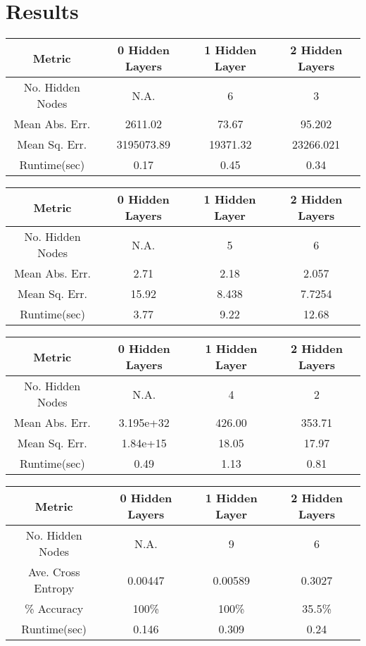 \documentclass[twoside,11pt]{article}
\begin{document}
\section{Results}
\begin{center}
	\begin{tabular}{|c c c c|}
		\hline
		Metric & 0 Hidden Layers & 1 Hidden Layer & 2 Hidden Layers \\ [0.5ex]
		\hline \hline
		No. Hidden Nodes & N.A. & 6 & 3 \\
		\hline
		Mean Abs. Err. & 2611.02 & 73.67 & 95.202 \\
		\hline
		Mean Sq. Err. & 3195073.89 & 19371.32 & 23266.021 \\
		\hline
		Runtime(sec) & 0.17 & 0.45 & 0.34 \\
		\hline
	\end{tabular}
\end{center}

\begin{center}
	\begin{tabular}{|c c c c|}
		\hline
		Metric & 0 Hidden Layers & 1 Hidden Layer & 2 Hidden Layers \\ [0.5ex]
		\hline \hline
		No. Hidden Nodes & N.A. & 5 & 6 \\
		\hline
		Mean Abs. Err. & 2.71 & 2.18 & 2.057 \\
		\hline
		Mean Sq. Err. & 15.92 & 8.438 & 7.7254 \\
		\hline
		Runtime(sec) & 3.77 & 9.22 & 12.68 \\
		\hline
	\end{tabular}
\end{center}


\begin{center}
	\begin{tabular}{|c c c c|}
		\hline
		Metric & 0 Hidden Layers & 1 Hidden Layer & 2 Hidden Layers \\ [0.5ex]
		\hline \hline
		No. Hidden Nodes & N.A. & 4 & 2 \\
		\hline
		Mean Abs. Err. & 3.195e+32 & 426.00 & 353.71 \\
		\hline
		Mean Sq. Err. & 1.84e+15 & 18.05 & 17.97 \\
		\hline
		Runtime(sec) & 0.49 & 1.13 &  0.81 \\
		\hline
	\end{tabular}
\end{center}


\begin{center}
	\begin{tabular}{|c c c c|}
		\hline
		Metric & 0 Hidden Layers & 1 Hidden Layer & 2 Hidden Layers \\ [0.5ex]
		\hline \hline
		No. Hidden Nodes & N.A. & 9 & 6 \\
		\hline
		Ave. Cross Entropy & 0.00447 & 0.00589 & 0.3027 \\
		\hline
		\% Accuracy & 100\% & 100\% & 35.5\% \\
		\hline
		Runtime(sec) & 0.146 & 0.309 & 0.24 \\
		\hline
	\end{tabular}
\end{center}
\end{document}
